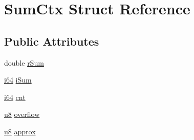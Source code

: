\hypertarget{struct_sum_ctx}{\section{Sum\-Ctx Struct Reference}
\label{struct_sum_ctx}
}
\subsection*{Public Attributes}
\begin{DoxyCompactItemize}
\item 
double \hyperlink{struct_sum_ctx_a1774080b9bcada2f4e867eaf40763f41}{r\-Sum}
\item 
\hyperlink{sqlite3_8c_a2a0f0f4ae7001eb54351f77ea1cdbcfd}{i64} \hyperlink{struct_sum_ctx_ace6196fb30ebc0687997a723d55683db}{i\-Sum}
\item 
\hyperlink{sqlite3_8c_a2a0f0f4ae7001eb54351f77ea1cdbcfd}{i64} \hyperlink{struct_sum_ctx_ada00261fe604a7cc6719fdcd8bb5914c}{cnt}
\item 
\hyperlink{sqlite3_8c_a74a0f6424ae628af25f23f0a35f6ead3}{u8} \hyperlink{struct_sum_ctx_a3b14a5da00584aff08314d5e9ddbe9ea}{overflow}
\item 
\hyperlink{sqlite3_8c_a74a0f6424ae628af25f23f0a35f6ead3}{u8} \hyperlink{struct_sum_ctx_a035a2a22271fee066d9a92d12fe3b9a5}{approx}
\end{DoxyCompactItemize}


